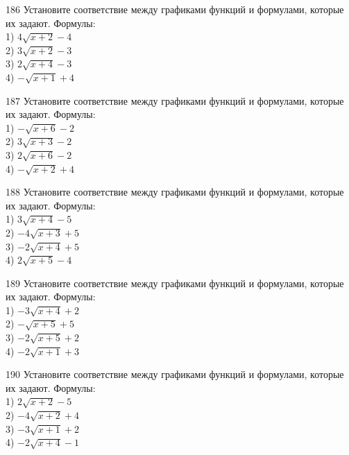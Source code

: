 \documentclass[4apaper]{article}
\begin{document}
\begin{taskBN}{186}
Установите соответствие между графиками функций и формулами, которые их задают. Формулы: \\1) $4\sqrt{x+2}-4$\\2) $3\sqrt{x+2}-3$\\3) $2\sqrt{x+4}-3$\\4) $-\sqrt{x+1}+4$
\end{taskBN}

\begin{taskBN}{187}
Установите соответствие между графиками функций и формулами, которые их задают. Формулы: \\1) $-\sqrt{x+6}-2$\\2) $3\sqrt{x+3}-2$\\3) $2\sqrt{x+6}-2$\\4) $-\sqrt{x+2}+4$
\end{taskBN}

\begin{taskBN}{188}
Установите соответствие между графиками функций и формулами, которые их задают. Формулы: \\1) $3\sqrt{x+4}-5$\\2) $-4\sqrt{x+3}+5$\\3) $-2\sqrt{x+4}+5$\\4) $2\sqrt{x+5}-4$
\end{taskBN}

\begin{taskBN}{189}
Установите соответствие между графиками функций и формулами, которые их задают. Формулы: \\1) $-3\sqrt{x+4}+2$\\2) $-\sqrt{x+5}+5$\\3) $-2\sqrt{x+5}+2$\\4) $-2\sqrt{x+1}+3$
\end{taskBN}

\begin{taskBN}{190}
Установите соответствие между графиками функций и формулами, которые их задают. Формулы: \\1) $2\sqrt{x+2}-5$\\2) $-4\sqrt{x+2}+4$\\3) $-3\sqrt{x+1}+2$\\4) $-2\sqrt{x+4}-1$
\end{taskBN}
\end{document}
